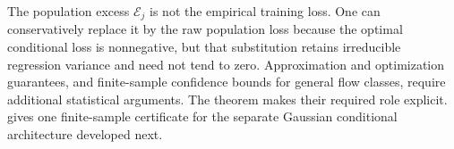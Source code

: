 The population excess $\mathcal E_j$ is not the empirical training loss. One can conservatively replace it by the raw population loss because the optimal conditional loss is nonnegative, but that substitution retains irreducible regression variance and need not tend to zero. Approximation and optimization guarantees, and finite-sample confidence bounds for general flow classes, require additional statistical arguments. The theorem makes their required role explicit.  gives one finite-sample certificate for the separate Gaussian conditional architecture developed next.
